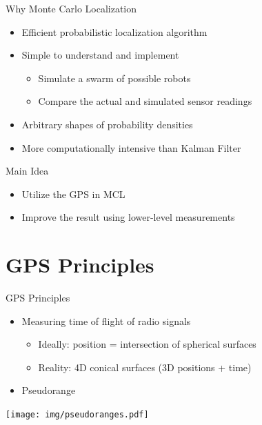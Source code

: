 \documentclass[utf8,12pt]{beamer}
\begin{document}
{
\begin{frame}{Why Monte Carlo Localization}
\begin{itemize}
    \item Efficient probabilistic localization algorithm
    \item Simple to understand and implement
    \begin{itemize}
        \item Simulate a swarm of possible robots
        \item Compare the actual and simulated sensor readings
    \end{itemize}
    \item Arbitrary shapes of probability densities
    \item More computationally intensive than Kalman Filter
\end{itemize}
\end{frame}
}

\begin{frame}{Main Idea}
\begin{itemize}
    \item Utilize the GPS in MCL
    \item Improve the result using lower-level measurements
\end{itemize}
\end{frame}

\section{GPS Principles}
\begin{frame}{GPS Principles}
    \begin{itemize}
        \item Measuring time of flight of radio signals
        \begin{itemize}
            \item Ideally: position = intersection of spherical surfaces
            \item Reality: 4D conical surfaces (3D positions + time)
        \end{itemize}
        \item Pseudorange
    \end{itemize}

    \vspace{0.2cm}
    \begin{center}
    \centerline{\texttt{[image: img/pseudoranges.pdf]}}
    \end{center}
\end{frame}
\end{document}
